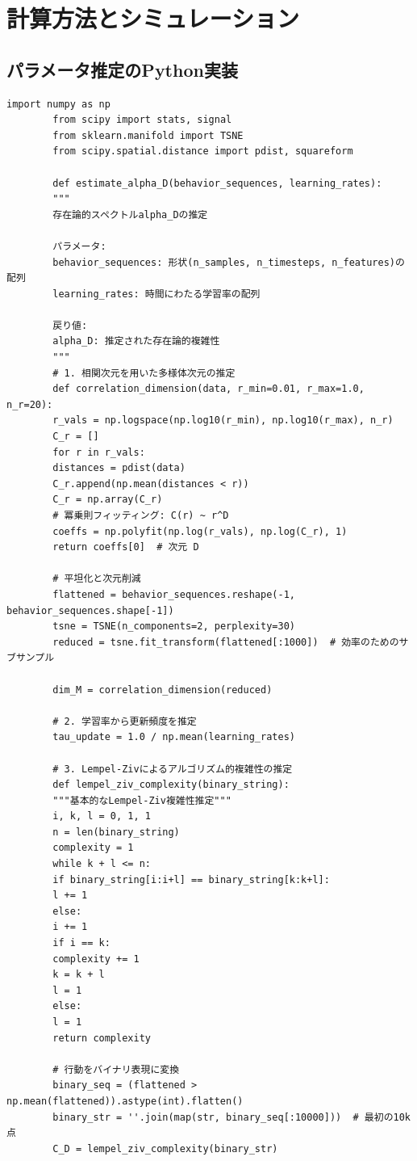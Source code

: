 \documentclass[11pt,a4paper]{article}
\begin{document}
	\section{計算方法とシミュレーション}
	
	\subsection{パラメータ推定のPython実装}
	
	\begin{lstlisting}[caption={時系列データからUCDパラメータを推定するPythonコード}, label={lst:ucd-python}]
		import numpy as np
		from scipy import stats, signal
		from sklearn.manifold import TSNE
		from scipy.spatial.distance import pdist, squareform
		
		def estimate_alpha_D(behavior_sequences, learning_rates):
		"""
		存在論的スペクトルalpha_Dの推定
		
		パラメータ:
		behavior_sequences: 形状(n_samples, n_timesteps, n_features)の配列
		learning_rates: 時間にわたる学習率の配列
		
		戻り値:
		alpha_D: 推定された存在論的複雑性
		"""
		# 1. 相関次元を用いた多様体次元の推定
		def correlation_dimension(data, r_min=0.01, r_max=1.0, n_r=20):
		r_vals = np.logspace(np.log10(r_min), np.log10(r_max), n_r)
		C_r = []
		for r in r_vals:
		distances = pdist(data)
		C_r.append(np.mean(distances < r))
		C_r = np.array(C_r)
		# 冪乗則フィッティング: C(r) ~ r^D
		coeffs = np.polyfit(np.log(r_vals), np.log(C_r), 1)
		return coeffs[0]  # 次元 D
		
		# 平坦化と次元削減
		flattened = behavior_sequences.reshape(-1, behavior_sequences.shape[-1])
		tsne = TSNE(n_components=2, perplexity=30)
		reduced = tsne.fit_transform(flattened[:1000])  # 効率のためのサブサンプル
		
		dim_M = correlation_dimension(reduced)
		
		# 2. 学習率から更新頻度を推定
		tau_update = 1.0 / np.mean(learning_rates)
		
		# 3. Lempel-Zivによるアルゴリズム的複雑性の推定
		def lempel_ziv_complexity(binary_string):
		"""基本的なLempel-Ziv複雑性推定"""
		i, k, l = 0, 1, 1
		n = len(binary_string)
		complexity = 1
		while k + l <= n:
		if binary_string[i:i+l] == binary_string[k:k+l]:
		l += 1
		else:
		i += 1
		if i == k:
		complexity += 1
		k = k + l
		l = 1
		else:
		l = 1
		return complexity
		
		# 行動をバイナリ表現に変換
		binary_seq = (flattened > np.mean(flattened)).astype(int).flatten()
		binary_str = ''.join(map(str, binary_seq[:10000]))  # 最初の10k点
		C_D = lempel_ziv_complexity(binary_str)
		

\end{lstlisting}
\end{document}
